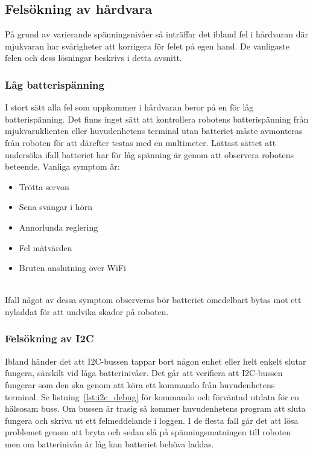 \documentclass{article}
\begin{document}
\subsection{Felsökning av hårdvara}
På grund av varierande spänningsnivåer så inträffar det ibland fel i hårdvaran där mjukvaran har svårigheter att korrigera för felet på egen hand. De vanligaste felen och dess lösningar beskrivs i detta avsnitt.

\subsubsection{Låg batterispänning}
I stort sätt alla fel som uppkommer i hårdvaran beror på en för låg batterispänning. Det finns inget sätt att kontrollera robotens batterispänning från mjukvaruklienten eller huvudenhetens terminal utan batteriet måste avmonteras från roboten för att därefter testas med en multimeter. Lättast sättet att undersöka ifall batteriet har för låg spänning är genom att observera robotens beteende. Vanliga symptom är:

\begin{itemize}
    \item Trötta servon
    \item Sena svängar i hörn
    \item Annorlunda reglering
    \item Fel mätvärden
    \item Bruten anslutning över WiFi
\end{itemize}
\ \\
Ifall något av dessa symptom observeras bör batteriet omedelbart bytas mot ett nyladdat för att undvika skador på roboten.

\subsubsection{Felsökning av I2C}
Ibland händer det att I2C-bussen tappar bort någon enhet eller helt enkelt slutar fungera, särskilt vid låga batterinivåer. Det går att verifiera att I2C-bussen fungerar som den ska genom att köra ett kommando från huvudenhetens terminal. Se listning~\ref{lst:i2c_debug} för kommando och förväntad utdata för en hälsosam buss. Om bussen är trasig så kommer huvudenhetens program att sluta fungera och skriva ut ett felmeddelande i loggen. I de flesta fall går det att lösa problemet genom att bryta och sedan slå på spänningsmatningen till roboten men om batterinivån är låg kan batteriet behöva laddas.
\end{document}
